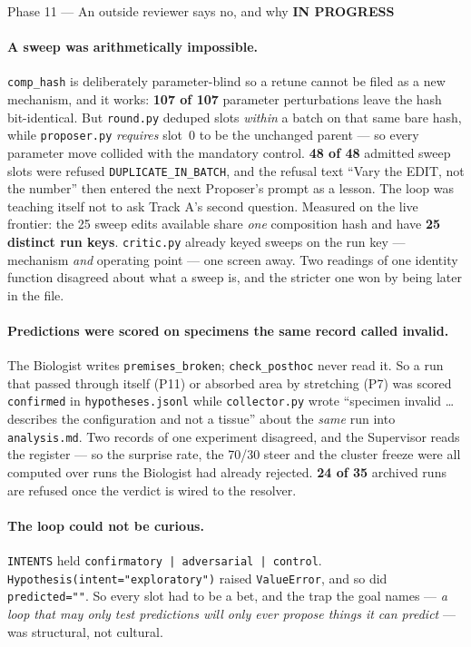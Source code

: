 \documentclass[11pt,a4paper]{article}
\newcommand{\code}[1]{\texttt{#1}}
\newcommand{\prog}{\textcolor{warn}{\textbf{IN PROGRESS}}}
\begin{document}
\begin{phasebox}{Phase 11 --- An outside reviewer says no, and why \hfill \prog}
\paragraph{A sweep was arithmetically impossible.} \code{comp\_hash} is deliberately
parameter-blind so a retune cannot be filed as a new mechanism, and it works: \textbf{107 of 107}
parameter perturbations leave the hash bit-identical. But \code{round.py} deduped slots
\emph{within} a batch on that same bare hash, while \code{proposer.py} \emph{requires} slot~0 to be
the unchanged parent --- so every parameter move collided with the mandatory control.
\textbf{48 of 48} admitted sweep slots were refused \code{DUPLICATE\_IN\_BATCH}, and the refusal
text ``Vary the EDIT, not the number'' then entered the next Proposer's prompt as a lesson. The
loop was teaching itself not to ask Track A's second question. Measured on the live frontier: the
25 sweep edits available share \emph{one} composition hash and have \textbf{25 distinct run keys}.
\code{critic.py} already keyed sweeps on the run key --- mechanism \emph{and} operating point ---
one screen away. Two readings of one identity function disagreed about what a sweep is, and the
stricter one won by being later in the file.

\paragraph{Predictions were scored on specimens the same record called invalid.} The Biologist
writes \code{premises\_broken}; \code{check\_posthoc} never read it. So a run that passed through
itself (P11) or absorbed area by stretching (P7) was scored \code{confirmed} in
\code{hypotheses.jsonl} while \code{collector.py} wrote ``specimen invalid \ldots describes the
configuration and not a tissue'' about the \emph{same} run into \code{analysis.md}. Two records of
one experiment disagreed, and the Supervisor reads the register --- so the surprise rate, the 70/30
steer and the cluster freeze were all computed over runs the Biologist had already rejected.
\textbf{24 of 35} archived runs are refused once the verdict is wired to the resolver.

\paragraph{The loop could not be curious.} \code{INTENTS} held
\code{confirmatory\,|\,adversarial\,|\,control}. \code{Hypothesis(intent="exploratory")} raised
\code{ValueError}, and so did \code{predicted=""}. So every slot had to be a bet, and the trap the
goal names --- \emph{a loop that may only test predictions will only ever propose things it can
predict} --- was structural, not cultural.


\end{phasebox}
\end{document}
